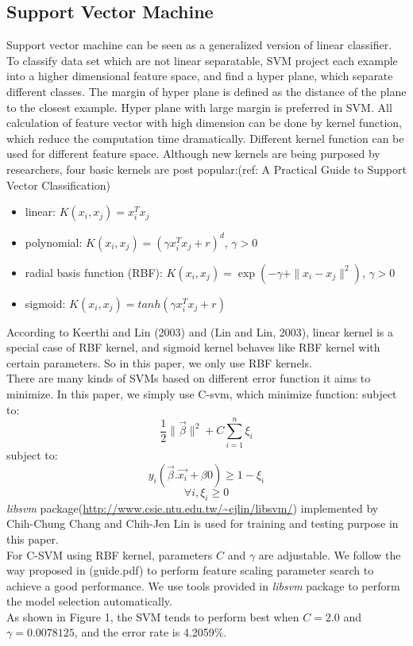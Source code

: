 \documentclass[a4paper,11pt]{article}
\begin{document}
\subsection{Support Vector Machine}
Support vector machine can be seen as a generalized version of linear classifier. To classify data set which are not linear separatable, SVM project each example into a higher dimensional feature space, and find a hyper plane, which separate different classes. The margin of hyper plane is defined as the distance of the plane to the closest example. Hyper plane with large margin is preferred in SVM. All calculation of feature vector with high dimension can be done by kernel function, which reduce the computation time dramatically. Different kernel function can be used for different feature space. Although new kernels are being purposed by researchers, four basic kernels are post popular:(ref: A Practical Guide to Support Vector Classification)
\begin{itemize}
\item linear: $K(x_i,x_j)=x_i^Tx_j$\\
\item polynomial: $K(x_i,x_j)=(\gamma x_i^Tx_j+r)^d$, $\gamma >0$\\
\item radial basis function (RBF): $K(x_i,x_j)=\exp(-\gamma + \|x_i-x_j\|^2)$, $\gamma > 0$\\
\item sigmoid: $K(x_i,x_j)=tanh(\gamma x_i^Tx_j+r)$\\
\end{itemize}
According to Keerthi and Lin (2003) and (Lin and Lin, 2003), linear kernel is a special case of RBF kernel, and sigmoid kernel behaves like RBF kernel with certain parameters. So in this paper, we only use RBF kernels.\\
There are many kinds of SVMs based on different error function it aims to minimize. In this paper, we simply use C-svm, which minimize function:
 subject to:$$\frac{1}{2}\|\vec{\beta}\|^2+C\sum_{i=1}^n \xi_i$$
 subject to:$$y_i(\vec{\beta}.\vec{x_i}+\beta{0})\geq 1-\xi_i$$$$\forall i, \xi_i\geq 0$$
\emph{libsvm} package(\url{http://www.csie.ntu.edu.tw/~cjlin/libsvm/}) implemented by Chih-Chung Chang and Chih-Jen Lin is used for training and testing purpose in this paper.\\

For C-SVM using RBF kernel, parameters $C$ and $\gamma$ are adjustable. We follow the way proposed in (guide.pdf) to perform feature scaling parameter search to achieve a good performance. We use tools provided in \emph{libsvm} package to perform the model selection automatically.\\
As shown in Figure 1, the SVM tends to perform best when $C=2.0$ and $\gamma=0.0078125$, and the error rate is 4.2059\%.
\end{document}
